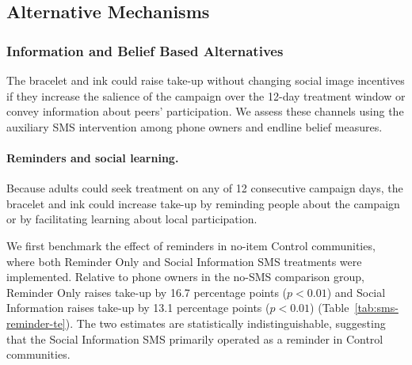 \documentclass[ECM\space ReStud.tex]{subfiles}
\begin{document}
\subsection{Alternative Mechanisms}

\subsubsection{Information and Belief Based Alternatives}\label{sec:sms-alternatives}

The bracelet and ink could raise take-up without changing social image incentives if they increase the salience of the campaign over the 12-day treatment window or convey information about peers' participation. We assess these channels using the auxiliary SMS intervention among phone owners and endline belief measures.

\paragraph{Reminders and social learning.}

Because adults could seek treatment on any of 12 consecutive campaign days, the bracelet and ink could increase take-up by reminding people about the campaign or by facilitating learning about local participation.

We first benchmark the effect of reminders in no-item Control communities, where both Reminder Only and Social Information SMS treatments were implemented. Relative to phone owners in the no-SMS comparison group, Reminder Only raises take-up by 16.7 percentage points (\(p<0.01\)) and Social Information raises take-up by 13.1 percentage points (\(p<0.01\)) (Table~\ref{tab:sms-reminder-te}). The two estimates are statistically indistinguishable, suggesting that the Social Information SMS primarily operated as a reminder in Control communities.
\end{document}
